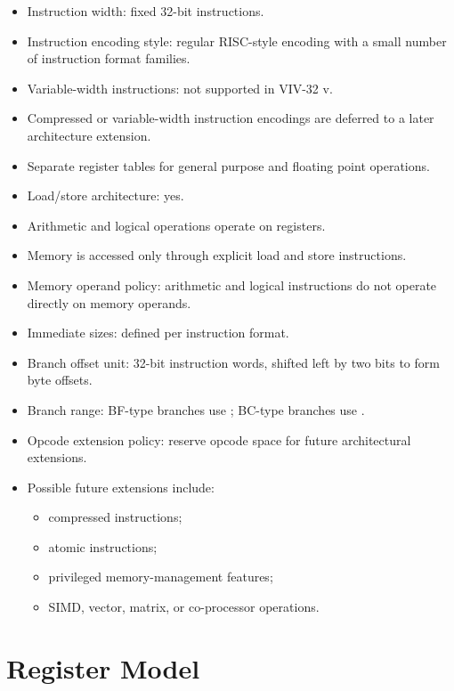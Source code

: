 \begin{itemize}
  \item Instruction width: fixed 32-bit instructions.
  \item Instruction encoding style: regular RISC-style encoding with a small
        number of instruction format families.
  \item Variable-width instructions: not supported in VIV-32 v\version{}.
  \item Compressed or variable-width instruction encodings are deferred to a
        later architecture extension.
  \item Separate register tables for general purpose and floating point
        operations.
  \item Load/store architecture: yes.
  \item Arithmetic and logical operations operate on registers.
  \item Memory is accessed only through explicit load and store instructions.
  \item Memory operand policy: arithmetic and logical instructions do not
        operate directly on memory operands.
  \item Immediate sizes: defined per instruction format.
  \item Branch offset unit: 32-bit instruction words, shifted left by two bits
        to form byte offsets.
  \item Branch range: BF-type branches use ; BC-type
        branches use .
  \item Opcode extension policy: reserve opcode space for future architectural
        extensions.
  \item Possible future extensions include:
  \begin{itemize}
    \item compressed instructions;
    \item atomic instructions;
    \item privileged memory-management features;
    \item SIMD, vector, matrix, or co-processor operations.
  \end{itemize}
\end{itemize}

\section{Register Model}

